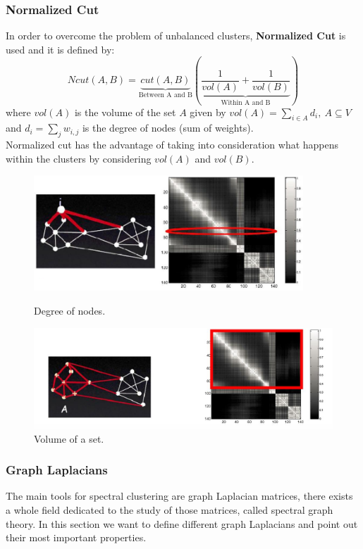 \subsubsection{Normalized Cut}
In order to overcome the problem of unbalanced clusters, \textbf{Normalized Cut} is used and it is defined by:
$$Ncut(A,B) = \underbrace{cut(A,B)}_{\text{Between A and B}}\left( \underbrace{\frac{1}{vol(A)} + \frac{1}{vol(B)}}_{\text{Within A and B}}\right)$$
where $vol(A)$ is the volume of the set $A$ given by $vol(A) = \sum_{i \in A}d_i,~A \subseteq V$ and $d_i = \sum_j w_{i,j}$ is the degree of nodes (sum of weights).\\
Normalized cut has the advantage of taking into consideration what happens within the clusters by considering $vol(A)$ and $vol(B)$.
\begin{figure}[H]
	\begin{minipage}[t]{0.46\linewidth} 
		\centering
		\includegraphics[width=0.9\textwidth]{img/degreeNodes}
		\caption{Degree of nodes.}
	\end{minipage}        
	\hspace{1cm}
	\begin{minipage}[t]{0.49\linewidth} 
		\centering
		\includegraphics[width=1\textwidth]{img/volumeSet}
		\caption{Volume of a set.}
	\end{minipage}
\end{figure}

\subsubsection{Graph Laplacians}
The main tools for spectral clustering are graph Laplacian matrices, there exists a whole field dedicated to the study of those matrices, called spectral graph theory.  In this section we want to define different graph Laplacians and point out their most important properties.

